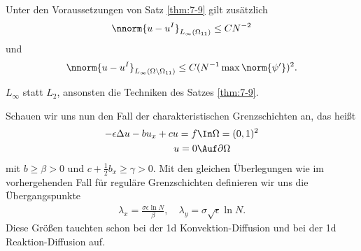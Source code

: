 \begin{lemma}\label{lem:7-10}
  Unter den Voraussetzungen von Satz \ref{thm:7-9} gilt zusätzlich
  \begin{align*}
    \nnorm{u - u^{I}}_{L_{\infty}(\Omega_{11})} \leq C N^{-2}
  \end{align*}
und
\begin{align*}
    \nnorm{u - u^{I}}_{L_{\infty}(\Omega\setminus\Omega_{11})} \leq C (N^{-1} \max\norm{\psi'})^{2}. 
\end{align*}
\end{lemma}
\begin{beweis}
  $L_{\infty}$ statt $L_{2}$, ansonsten die Techniken des Satzes \ref{thm:7-9}. 
\end{beweis}

Schauen wir uns nun den Fall der charakteristischen Grenzschichten an, das heißt
\begin{align*}
  - \epsilon \Delta u - b u_{x} + cu = f &\In \Omega = (0, 1)^{2} \\
u = 0& \Auf \partial \Omega 
\end{align*}
mit $b \geq \beta > 0$ und $ c + \frac 12 b_{x} \geq \gamma> 0$. 
Mit den gleichen Überlegungen wie im vorhergehenden Fall für reguläre Grenzschichten definieren wir uns die Übergangspunkte
\begin{align*}
  \lambda_{x} = \frac{\sigma\epsilon \ln N} \beta, \quad   \lambda_{y} = \sigma \sqrt\epsilon \ln N. 
\end{align*}
Diese Größen tauchten schon bei der 1d Konvektion-Diffusion und bei der 1d Reaktion-Diffusion auf. 
